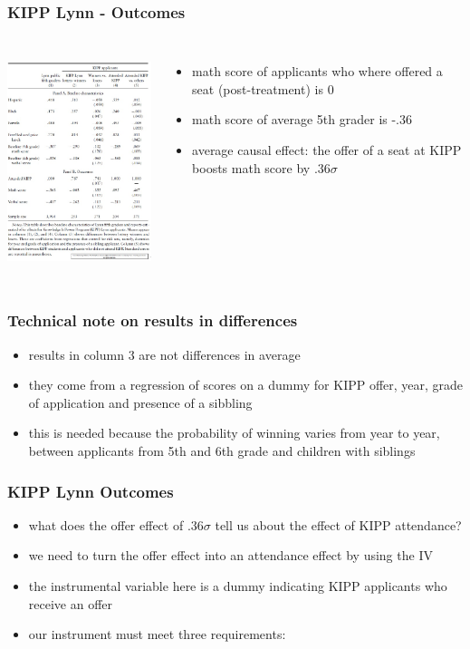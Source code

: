 \documentclass{beamer}
\begin{document}
\begin{frame}
\frametitle{KIPP Lynn - Outcomes}
\begin{columns}
\includegraphics[width=6.5cm,height=6.5cm,keepaspectratio]{Table 3.1} 

\begin{itemize}
	\item math score of applicants who where offered a seat (post-treatment) is 0
	\item math score of average 5th grader is -.36
	\item average causal effect: the offer of a seat at KIPP boosts math score by $.36\sigma$
\end{itemize}

\end{columns}

\end{frame}

\begin{frame}
\frametitle{Technical note on results in differences}
	\begin{itemize}
	\item results in column 3 are not differences in average 
	\item they come from a regression of scores on a dummy for KIPP offer, year, grade of application and presence of a sibbling
	\item this is needed because the probability of winning varies from year to year, between applicants from 5th and 6th grade and children with siblings
	\end{itemize}
\end{frame}

\begin{frame}
\frametitle{KIPP Lynn Outcomes}
	\begin{itemize}
	\item what does the offer effect of $.36\sigma$ tell us about the effect of KIPP attendance?
	\item we need to turn the offer effect into an attendance effect by using the IV
	\item the instrumental variable here is a dummy indicating KIPP applicants who receive an offer
	\item our instrument must meet three requirements:
	\end{itemize}
\end{frame}
\end{document}
